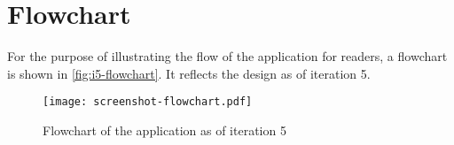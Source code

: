 \chapter{Flowchart}
\label{ap:flowchart}

For the purpose of illustrating the flow of the application for readers, a flowchart is shown in \autoref{fig:i5-flowchart}. It reflects the design as of iteration 5.

\begin{figure}
    \centering
    \texttt{[image: screenshot-flowchart.pdf]}
    \caption{Flowchart of the application as of iteration 5}
    \label{fig:i5-flowchart}
\end{figure}
